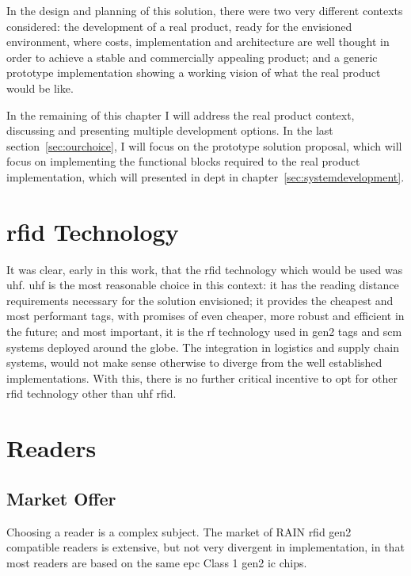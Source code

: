 In the design and planning of this solution, there were two very different contexts considered: the development of a real product, ready for the envisioned environment, where costs, implementation and architecture are well thought in order to achieve a stable and commercially appealing product; and a generic prototype implementation showing a working vision of what the real product would be like.

In the remaining of this chapter I will address the real product context, discussing and presenting multiple development options. In the last section~\ref{sec:ourchoice}, I will focus on the prototype solution proposal, which will focus on implementing the functional blocks required to the real product implementation, which will presented in dept in chapter~\ref{sec:systemdevelopment}.

\section{\acs{rfid} Technology}

It was clear, early in this work, that the \ac{rfid} technology which would be used was \ac{uhf}. 
\ac{uhf} is the most reasonable choice in this context: it has the reading distance requirements necessary for the solution envisioned; it provides the cheapest and most performant tags, with promises of even cheaper, more robust and efficient in the future; and most important, it is the \ac{rf} technology used in \ac{gen2} tags and \ac{scm} systems deployed around the globe. 
The integration in logistics and supply chain systems, would not make sense otherwise to diverge from the well established implementations.
With this, there is no further critical incentive to opt for other \ac{rfid} technology other than \ac{uhf} \ac{rfid}.

\section{Readers}

\subsection{Market Offer}

Choosing a reader is a complex subject. The market of RAIN \ac{rfid} \ac{gen2} compatible readers is extensive, but not very divergent in implementation, in that most readers are based on the same \ac{epc} Class 1 \ac{gen2} \ac{ic} chips.

